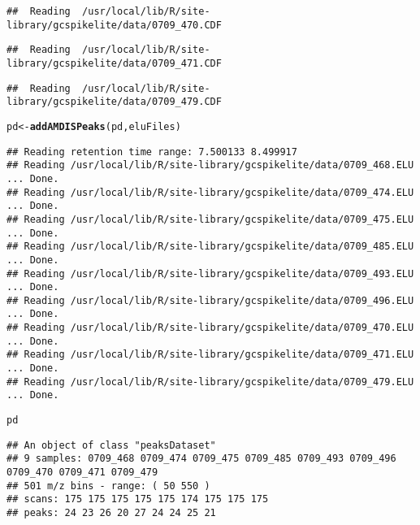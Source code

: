 \documentclass{article}\usepackage[]{graphicx}\usepackage[]{color}
\makeatletter
\newcommand{\hlstd}[1]{\textcolor[rgb]{0.345,0.345,0.345}{#1}}%
\newcommand{\hlkwb}[1]{\textcolor[rgb]{0.69,0.353,0.396}{#1}}%
\newcommand{\hlkwd}[1]{\textcolor[rgb]{0.737,0.353,0.396}{\textbf{#1}}}%
\newenvironment{kframe}{%
 \def\at@end@of@kframe{}%
 \ifinner\ifhmode%
  \def\at@end@of@kframe{\end{minipage}}%
  \begin{minipage}{\columnwidth}%
 \fi\fi%
 \def\FrameCommand##1{\hskip\@totalleftmargin \hskip-\fboxsep
 \colorbox{shadecolor}{##1}\hskip-\fboxsep
     \hskip-\linewidth \hskip-\@totalleftmargin \hskip\columnwidth}%
 \MakeFramed {\advance\hsize-\width
   \@totalleftmargin\z@ \linewidth\hsize
   \@setminipage}}%
 {\par\unskip\endMakeFramed%
 \at@end@of@kframe}
\newenvironment{knitrout}{}{} %
\makeatother
\begin{document}
\begin{knitrout}
\begin{kframe}
{\ttfamily\noindent\itshape\color{messagecolor}{\#\# Create profile matrix with method 'bin' and step 1 ... OK}}\begin{verbatim}
##  Reading  /usr/local/lib/R/site-library/gcspikelite/data/0709_470.CDF
\end{verbatim}


{\ttfamily\noindent\itshape\color{messagecolor}{\#\# Create profile matrix with method 'bin' and step 1 ... OK}}\begin{verbatim}
##  Reading  /usr/local/lib/R/site-library/gcspikelite/data/0709_471.CDF
\end{verbatim}


{\ttfamily\noindent\itshape\color{messagecolor}{\#\# Create profile matrix with method 'bin' and step 1 ... OK}}\begin{verbatim}
##  Reading  /usr/local/lib/R/site-library/gcspikelite/data/0709_479.CDF
\end{verbatim}


{\ttfamily\noindent\itshape\color{messagecolor}{\#\# Create profile matrix with method 'bin' and step 1 ... OK}}\begin{alltt}
\hlstd{pd} \hlkwb{<-} \hlkwd{addAMDISPeaks}\hlstd{(pd, eluFiles)}
\end{alltt}
\begin{verbatim}
## Reading retention time range: 7.500133 8.499917 
## Reading /usr/local/lib/R/site-library/gcspikelite/data/0709_468.ELU ... Done.
## Reading /usr/local/lib/R/site-library/gcspikelite/data/0709_474.ELU ... Done.
## Reading /usr/local/lib/R/site-library/gcspikelite/data/0709_475.ELU ... Done.
## Reading /usr/local/lib/R/site-library/gcspikelite/data/0709_485.ELU ... Done.
## Reading /usr/local/lib/R/site-library/gcspikelite/data/0709_493.ELU ... Done.
## Reading /usr/local/lib/R/site-library/gcspikelite/data/0709_496.ELU ... Done.
## Reading /usr/local/lib/R/site-library/gcspikelite/data/0709_470.ELU ... Done.
## Reading /usr/local/lib/R/site-library/gcspikelite/data/0709_471.ELU ... Done.
## Reading /usr/local/lib/R/site-library/gcspikelite/data/0709_479.ELU ... Done.
\end{verbatim}
\begin{alltt}
\hlstd{pd}
\end{alltt}
\begin{verbatim}
## An object of class "peaksDataset"
## 9 samples: 0709_468 0709_474 0709_475 0709_485 0709_493 0709_496 0709_470 0709_471 0709_479 
## 501 m/z bins - range: ( 50 550 )
## scans: 175 175 175 175 175 174 175 175 175 
## peaks: 24 23 26 20 27 24 24 25 21
\end{verbatim}
\end{kframe}
\end{knitrout}
\end{document}
